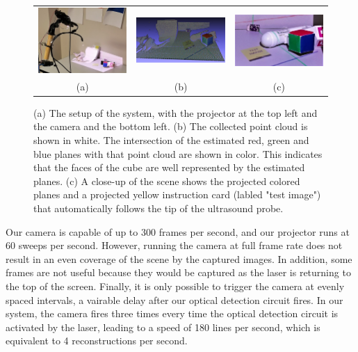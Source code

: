 \documentclass{llncs}
\begin{document}
\begin{figure}
\centering
\begin{tabular}{ccc}
\centering
\includegraphics[width=4cm,keepaspectratio]{Final-Setup} &
\includegraphics[width=4cm,keepaspectratio]{Final-Reconstruction} &
\includegraphics[width=4cm,keepaspectratio]{Final-CameraView}\\
(a) & (b) & (c)
\end{tabular}

\caption{
(a) The setup of the system, with the projector at the top left and the camera and the bottom left. (b) The collected point cloud is shown in white. The intersection of the estimated red, green and blue planes with that point cloud are shown in color. This indicates that the faces of the cube are well represented by the estimated planes. (c) A close-up of the scene shows the projected colored planes and a projected yellow instruction card (labled "test image") that automatically follows the tip of the ultrasound probe.
}
\end{figure}

Our camera is capable of up to 300 frames per second, and our projector runs at 60 sweeps per second. However, running the camera at full frame rate does not result in an even coverage of the scene by the captured images. In addition, some frames are not useful because they would be captured as the laser is returning to the top of the screen. Finally, it is only possible to trigger the camera at evenly spaced intervals, a vairable delay after our optical detection circuit fires. In our system, the camera fires three times every time the optical detection circuit is activated by the laser, leading to a speed of 180 lines per second, which is equivalent to 4 reconstructions per second.
\end{document}
